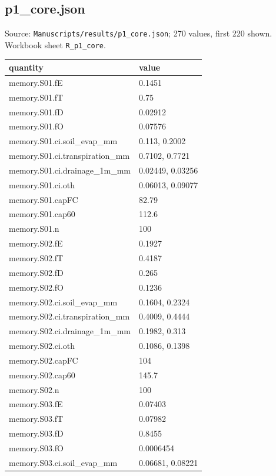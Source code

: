 \subsection*{p1\_core.json}
\noindent\small Source: \nolinkurl{Manuscripts/results/p1_core.json}; 270 values, first 220 shown. Workbook sheet \texttt{R\_p1\_core}.\par
{\scriptsize\begin{longtable}{p{}p{}}\toprule\textbf{quantity} & \textbf{value}\\\midrule\endhead
{}memory.S01.fE & 0.1451\\
{}memory.S01.fT & 0.75\\
{}memory.S01.fD & 0.02912\\
{}memory.S01.fO & 0.07576\\
{}memory.S01.ci.soil\_evap\_mm & 0.113, 0.2002\\
{}memory.S01.ci.transpiration\_mm & 0.7102, 0.7721\\
{}memory.S01.ci.drainage\_1m\_mm & 0.02449, 0.03256\\
{}memory.S01.ci.oth & 0.06013, 0.09077\\
{}memory.S01.capFC & 82.79\\
{}memory.S01.cap60 & 112.6\\
{}memory.S01.n & 100\\
{}memory.S02.fE & 0.1927\\
{}memory.S02.fT & 0.4187\\
{}memory.S02.fD & 0.265\\
{}memory.S02.fO & 0.1236\\
{}memory.S02.ci.soil\_evap\_mm & 0.1604, 0.2324\\
{}memory.S02.ci.transpiration\_mm & 0.4009, 0.4444\\
{}memory.S02.ci.drainage\_1m\_mm & 0.1982, 0.313\\
{}memory.S02.ci.oth & 0.1086, 0.1398\\
{}memory.S02.capFC & 104\\
{}memory.S02.cap60 & 145.7\\
{}memory.S02.n & 100\\
{}memory.S03.fE & 0.07403\\
{}memory.S03.fT & 0.07982\\
{}memory.S03.fD & 0.8455\\
{}memory.S03.fO & 0.0006454\\
{}memory.S03.ci.soil\_evap\_mm & 0.06681, 0.08221\\

\end{longtable}}
